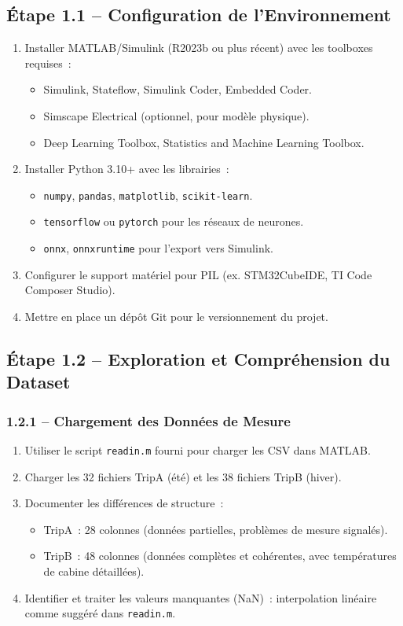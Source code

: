 \documentclass[a4paper,12pt]{article}
\begin{document}
\subsection{Étape 1.1 -- Configuration de l'Environnement}
\begin{enumerate}[nosep]
  \item Installer MATLAB/Simulink (R2023b ou plus récent) avec les toolboxes requises~:
    \begin{itemize}[nosep]
      \item Simulink, Stateflow, Simulink Coder, Embedded Coder.
      \item Simscape Electrical (optionnel, pour modèle physique).
      \item Deep Learning Toolbox, Statistics and Machine Learning Toolbox.
    \end{itemize}
  \item Installer Python 3.10+ avec les librairies~:
    \begin{itemize}[nosep]
      \item \texttt{numpy}, \texttt{pandas}, \texttt{matplotlib}, \texttt{scikit-learn}.
      \item \texttt{tensorflow} ou \texttt{pytorch} pour les réseaux de neurones.
      \item \texttt{onnx}, \texttt{onnxruntime} pour l'export vers Simulink.
    \end{itemize}
  \item Configurer le support matériel pour PIL (ex. STM32CubeIDE, TI Code Composer Studio).
  \item Mettre en place un dépôt Git pour le versionnement du projet.
\end{enumerate}

\subsection{Étape 1.2 -- Exploration et Compréhension du Dataset}

\subsubsection{1.2.1 -- Chargement des Données de Mesure}
\begin{enumerate}[nosep]
  \item Utiliser le script \texttt{readin.m} fourni pour charger les CSV dans MATLAB.
  \item Charger les 32 fichiers TripA (été) et les 38 fichiers TripB (hiver).
  \item Documenter les différences de structure~:
    \begin{itemize}[nosep]
      \item TripA~: 28 colonnes (données partielles, problèmes de mesure signalés).
      \item TripB~: 48 colonnes (données complètes et cohérentes, avec températures de cabine détaillées).
    \end{itemize}
  \item Identifier et traiter les valeurs manquantes (NaN)~: interpolation linéaire comme suggéré dans \texttt{readin.m}.
\end{enumerate}
\end{document}
